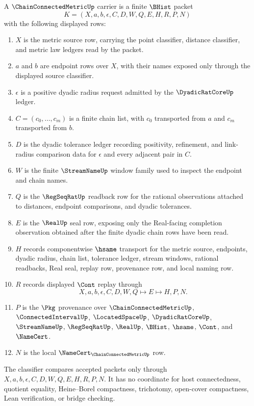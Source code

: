 \begin{definition}
\label{def:chain-connected-metric-carrier}
A $\ChainConnectedMetricUp$ carrier is a finite $\BHist$ packet
$$
K=(X,a,b,\epsilon,C,D,W,Q,E,H,R,P,N)
$$
with the following displayed rows:
\begin{enumerate}
\item $X$ is the metric source row, carrying the point classifier, distance classifier, and metric law ledgers read by the packet.
\item $a$ and $b$ are endpoint rows over $X$, with their names exposed only through the displayed source classifier.
\item $\epsilon$ is a positive dyadic radius request admitted by the $\DyadicRatCoreUp$ ledger.
\item $C=(c_0,\ldots,c_m)$ is a finite chain list, with $c_0$ transported from $a$ and $c_m$ transported from $b$.
\item $D$ is the dyadic tolerance ledger recording positivity, refinement, and link-radius comparison data for $\epsilon$ and every adjacent pair in $C$.
\item $W$ is the finite $\StreamNameUp$ window family used to inspect the endpoint and chain names.
\item $Q$ is the $\RegSeqRatUp$ readback row for the rational observations attached to distances, endpoint comparisons, and dyadic tolerances.
\item $E$ is the $\RealUp$ seal row, exposing only the Real-facing completion observation obtained after the finite dyadic chain rows have been read.
\item $H$ records componentwise $\hsame$ transport for the metric source, endpoints, dyadic radius, chain list, tolerance ledger, stream windows, rational readbacks, Real seal, replay row, provenance row, and local naming row.
\item $R$ records displayed $\Cont$ replay through
$$
X,a,b,\epsilon,C,D,W,Q \longmapsto E \longmapsto H,P,N .
$$
\item $P$ is the $\Pkg$ provenance over $\ChainConnectedMetricUp$, $\ConnectedIntervalUp$, $\LocatedSpaceUp$, $\DyadicRatCoreUp$, $\StreamNameUp$, $\RegSeqRatUp$, $\RealUp$, $\BHist$, $\hsame$, $\Cont$, and $\NameCert$.
\item $N$ is the local $\NameCert_{\ChainConnectedMetricUp}$ row.
\end{enumerate}
The classifier compares accepted packets only through $X,a,b,\epsilon,C,D,W,Q,E,H,R,P,N$. It has no coordinate for host connectedness, quotient equality, Heine--Borel compactness, trichotomy, open-cover compactness, Lean verification, or bridge checking.
\end{definition}


